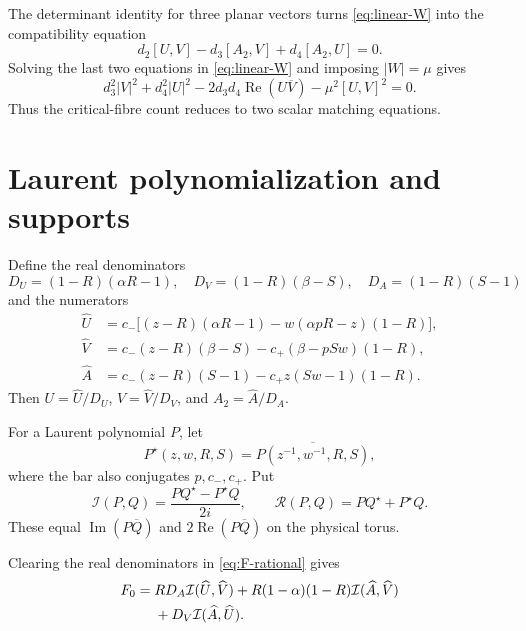 \documentclass[11pt]{article}
\newcommand{\im}{\operatorname{Im}}
\newcommand{\re}{\operatorname{Re}}
\begin{document}
The determinant identity for three planar vectors turns \eqref{eq:linear-W} into the compatibility equation
\begin{equation}\label{eq:F-rational}
 d_2[U,V]-d_3[A_2,V]+d_4[A_2,U]=0.
\end{equation}
Solving the last two equations in \eqref{eq:linear-W} and imposing $|W|=\mu$ gives
\begin{equation}\label{eq:G-rational}
 d_3^2|V|^2+d_4^2|U|^2
 -2d_3d_4\re(U\overline V)-\mu^2[U,V]^2=0.
\end{equation}
Thus the critical-fibre count reduces to two scalar matching equations.

\section{Laurent polynomialization and supports}\label{sec:laurent}

Define the real denominators
\begin{equation}\label{eq:denominators}
 D_U=(1-R)(\alpha R-1),\quad
 D_V=(1-R)(\beta-S),\quad
 D_A=(1-R)(S-1)
\end{equation}
and the numerators
\begin{align}
 \widehat U&=c_-\bigl[(z-R)(\alpha R-1)
 -w(\alpha pR-z)(1-R)\bigr],\label{eq:Uhat}\\
 \widehat V&=c_-(z-R)(\beta-S)
 -c_+(\beta-pSw)(1-R),\label{eq:Vhat}\\
 \widehat A&=c_-(z-R)(S-1)
 -c_+z(Sw-1)(1-R).\label{eq:Ahat}
\end{align}
Then $U=\widehat U/D_U$, $V=\widehat V/D_V$, and $A_2=\widehat A/D_A$.

For a Laurent polynomial $P$, let
\begin{equation}\label{eq:star}
 P^\star(z,w,R,S)=\overline{P(z^{-1},w^{-1},R,S)},
\end{equation}
where the bar also conjugates $p,c_-,c_+$.  Put
\begin{equation}\label{eq:IR}
 \mathcal I(P,Q)=\frac{PQ^\star-P^\star Q}{2i},
 \qquad
 \mathcal R(P,Q)=PQ^\star+P^\star Q.
\end{equation}
These equal $\im(P\overline Q)$ and $2\re(P\overline Q)$ on the physical torus.

Clearing the real denominators in \eqref{eq:F-rational} gives
\begin{align}
 F_0={}&R D_A\mathcal I(\widehat U,\widehat V)
 +R(1-\alpha)(1-R)\mathcal I(\widehat A,\widehat V)\notag\\
 &+D_V\mathcal I(\widehat A,\widehat U).\label{eq:F0}
\end{align}
\end{document}
